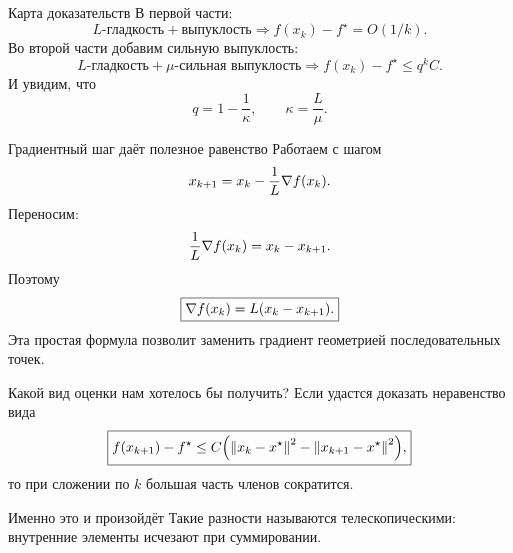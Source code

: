 \begin{frame}{Карта доказательств}
\small
В первой части:
\[
\boxed{L\text{-гладкость}+\text{выпуклость}}
\Longrightarrow
\boxed{f(x_k)-f^\star=O(1/k)}.
\]
Во второй части добавим сильную выпуклость:
\[
\boxed{L\text{-гладкость}+\mu\text{-сильная выпуклость}}
\Longrightarrow
\boxed{f(x_k)-f^\star\le q^k C}.
\]
И увидим, что
\[
q=1-\frac{1}{\kappa},
\qquad
\kappa=\frac{L}{\mu}.
\]
\end{frame}

\begin{frame}{Градиентный шаг даёт полезное равенство}
\small
Работаем с шагом
\[
x_{k+1}=x_k-\frac1L\nabla f(x_k).
\]
Переносим:
\[
\frac1L\nabla f(x_k)=x_k-x_{k+1}.
\]
Поэтому
\[
\boxed{
\nabla f(x_k)=L(x_k-x_{k+1}).
}
\]
Эта простая формула позволит заменить градиент геометрией последовательных точек.
\end{frame}

\begin{frame}{Какой вид оценки нам хотелось бы получить?}
\small
Если удастся доказать неравенство вида
\[
\boxed{
 f(x_{k+1})-f^\star
 \le
 C\Bigl(
 \left\lVert x_k-x^\star\right\rVert^2
 -
 \left\lVert x_{k+1}-x^\star\right\rVert^2
 \Bigr),
}
\]
то при сложении по $k$ большая часть членов сократится.

\begin{alertblock}{Именно это и произойдёт}
Такие разности называются телескопическими: внутренние элементы исчезают при суммировании.
\end{alertblock}
\end{frame}
